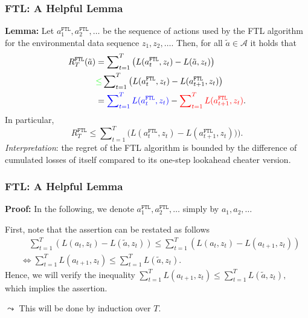 \documentclass[11pt,compress,t,notes=noshow, xcolor=table]{beamer}
\renewcommand{\l}{L}
\newcommand{\Aspace}{\mathcal{A}}
\newcommand{\FTL}{\texttt{FTL}}
\begin{document}
\begin{frame} 
	\frametitle{FTL: A Helpful Lemma}
	\small
	 \textbf{Lemma:}
		Let $a_1^{\FTL}, a_2^{\FTL}, \ldots$ be the sequence of actions used by the FTL algorithm for the environmental data sequence $z_1,z_2,\ldots .$
		 Then, for all $\tilde a \in \Aspace$ it holds that 
		\begin{align*}
			R_T^{\FTL}(\tilde a) 
			&= \sum\nolimits_{t=1}^T \left(\l(a_t^{\FTL},z_t) - \l(\tilde a,z_t)\right) \\
%			
			& {\color{green} \leq} \sum\nolimits_{t=1}^T \left(\l(a_t^{\FTL},z_t) - \l(a_{t+1}^{\FTL},z_t)\right)\\
%			
			&= {\color{blue} \sum\nolimits_{t=1}^T \l(a_t^{\FTL},z_t) }-  {\color{red}\sum\nolimits_{t=1}^T  \l(a_{t+1}^{\FTL},z_t)}.
		\end{align*}
		 In particular,
		\begin{equation*}
			R_T^{\FTL} \leq \sum\nolimits_{t=1}^T \big(\l(a_t^{\FTL},z_t) - \l(a_{t+1}^{\FTL},z_t))\big).
		\end{equation*}
		 \emph{Interpretation}: the regret of the FTL algorithm is {\color{green}bounded} by {\color{blue} the difference of cumulated losses of itself} compared to {\color{red} its one-step lookahead cheater version}.
\end{frame}

\begin{frame} 
	\frametitle{FTL: A Helpful Lemma}
	\small
		\textbf{Proof:}
		In the following, we denote  $a_1^{\FTL}, a_2^{\FTL}, \ldots$  simply by  $a_1, a_2, \ldots$  	
		
		 First, note that the assertion can be restated as follows
		\begin{equation*}
			\begin{split}
				&\quad \sum\limits_{t=1}^T \left(\l(a_t,z_t) - \l(\tilde a,z_t)\right) \leq \sum\limits_{t=1}^T \left(\l(a_t,z_t) - \l(a_{t+1},z_t)\right) \\
				 &\Leftrightarrow \sum\limits_{t=1}^T \l(a_{t+1},z_t) \leq  \sum\limits_{t=1}^T \l(\tilde a,z_t).
			\end{split} 
		\end{equation*}
		 Hence, we will verify the inequality $\sum\nolimits_{t=1}^T \l(a_{t+1},z_t) \leq  \sum\nolimits_{t=1}^T \l(\tilde a,z_t),$ which implies the assertion.
		 \lz
		 
		 $\leadsto$ This will be done  by induction over $T$.
\end{frame}
\end{document}
